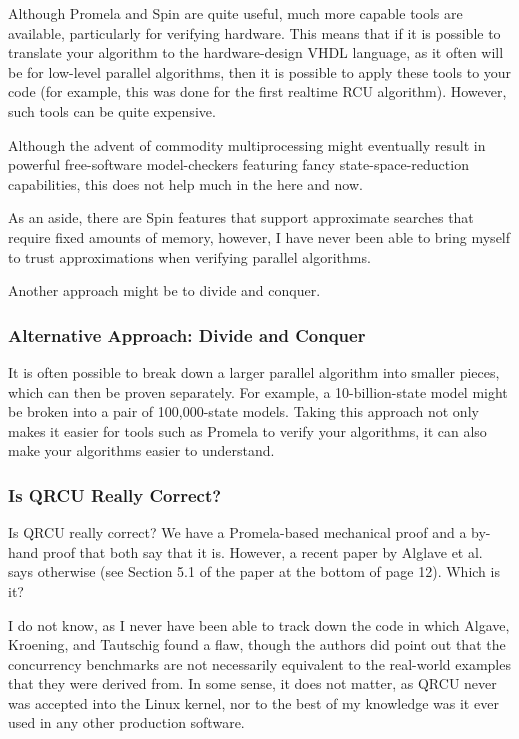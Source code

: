 Although Promela and Spin are quite useful,
much more capable tools are available, particularly for verifying
hardware.
This means that if it is possible to translate your algorithm
to the hardware-design VHDL language, as it often will be for
low-level parallel algorithms, then it is possible to apply these
tools to your code (for example, this was done for the first
realtime RCU algorithm).
However, such tools can be quite expensive.

Although the advent of commodity multiprocessing
might eventually result in powerful free-software model-checkers
featuring fancy state-space-reduction capabilities,
this does not help much in the here and now.

As an aside, there are Spin features that support approximate searches
that require fixed amounts of memory, however, I have never been able
to bring myself to trust approximations when verifying parallel
algorithms.

Another approach might be to divide and conquer.

\subsubsection{Alternative Approach: Divide and Conquer}
\label{sec:formal:Alternative Approach: Divide and Conquer}

It is often possible to break down a larger parallel algorithm into
smaller pieces, which can then be proven separately.
For example, a 10-billion-state model might be broken into a pair
of 100,000-state models.
Taking this approach not only makes it easier for tools such as
Promela to verify your algorithms, it can also make your algorithms
easier to understand.

\subsubsection{Is QRCU Really Correct?}
\label{sec:formal:Is QRCU Really Correct?}

Is QRCU really correct?
We have a Promela-based mechanical proof and a by-hand proof that both
say that it is.
However, a recent paper by Alglave et al.~\cite{JadeAlglave2013-cav}
says otherwise (see Section 5.1 of the paper at the bottom of page 12).
Which is it?

I do not know, as I never have been able to track down the code in which
Algave, Kroening, and Tautschig found a flaw, though the authors did
point out that the concurrency benchmarks are not necessarily equivalent
to the real-world examples that they were derived from.
In some sense, it does not matter, as QRCU never was accepted into the
Linux kernel, nor to the best of my knowledge was it ever used in any
other production software.

